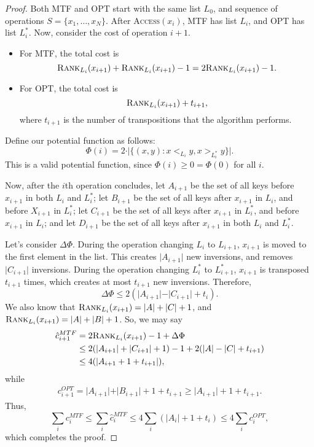 \begin{proof}
Both \textsc{MTF} and \textsc{OPT} start with the same list $L_0$, and sequence of operations $S = \{x_1, \hdots, x_N\}$. After \textsc{Access}$(x_i)$, MTF has list $L_i$, and OPT has list $L_i^*$. Now, consider the cost of operation $i+1$. 
\begin{itemize}
    \item For MTF, the total cost is 
    \[\textsc{Rank}_{L_i}(x_{i+1}) + \textsc{Rank}_{L_i}(x_{i+1})-1 = 2\textsc{Rank}_{L_i}(x_{i+1})-1.\]
    \item For OPT, the total cost is 
    \[\textsc{Rank}_{L_i}(x_{i+1})+t_{i+1},\] 
    where $t_{i+1}$ is the number of transpositions that the algorithm performs.
\end{itemize}
Define our potential function as follows: 
\[\Phi(i) = 2\cdot \vert\{(x,y) : x <_{L_i} y, x >_{L_i^*} y\}\vert.\]
This is a valid potential function, since $\Phi(i)\geq 0 = \Phi(0)$ for all $i$. 

Now, after the $i$th operation concludes, let $A_{i+1}$ be the set of all keys before $x_{i+1}$ in both $L_i$ and $L_i^*$; let $B_{i+1}$ be the set of all keys after $x_{i+1}$ in $L_i$, and before $X_{i+1}$ in $L_i^*$; let $C_{i+1}$ be the set of all keys after $x_{i+1}$ in $L_i^*$, and before $x_{i+1}$ in $L_i$; and let $D_{i+1}$ be the set of all keys after $x_{i+1}$ in both $L_i$ and $L_i^*$.

Let's consider $\Delta \Phi$. During the operation changing $L_i$ to $L_{i+1}$, $x_{i+1}$ is moved to the first element in the list. This creates $\vert A_{i+1}\vert$ new inversions, and removes $\vert C_{i+1}\vert$ inversions. During the operation changing $L_i^*$ to $L_{i+1}^*$, $x_{i+1}$ is transposed $t_{i+1}$ times, which creates at most $t_{i+1}$ new inversions. Therefore, 
\[\Delta \Phi \leq 2(\vert A_{i+1}\vert  - \vert C_{i+1}\vert + t_i).\]
We also know that $\textsc{Rank}_{L_i}(x_{i+1}) = \vert A\vert + \vert C\vert + 1$, and $\textsc{Rank}_{L_i}(x_{i+1}) = \vert A\vert + \vert B\vert + 1$. So, we may say
\begin{align*}
    \hat{c}_{i+1}^{MTF} &= 2\textsc{Rank}_{L_i}(x_{i+1})-1+\Delta \Phi \\
    &\leq 2(\vert A_{i+1}\vert + \vert C_{i+1}\vert + 1) - 1 + 2(\vert A\vert - \vert C\vert + t_{i+1}) \\
    &\leq 4(\vert A_{i+1} + 1 + t_{i+1}\vert),
\end{align*}
while
\begin{align*}
    c_{i+1}^{OPT} = \vert A_{i+1}\vert + \vert B_{i+1}\vert + 1 + t_{i+1} \geq \vert A_{i+1}\vert + 1 + t_{i+1}.
\end{align*}
Thus,
\[\sum_i c_i^{MTF}\leq \sum_i \hat{c}_i^{MTF} \leq 4\sum_i(\vert A_i\vert + 1 + t_i) \leq 4 \sum_i c_{i}^{OPT},\]
which completes the proof.
\end{proof}

